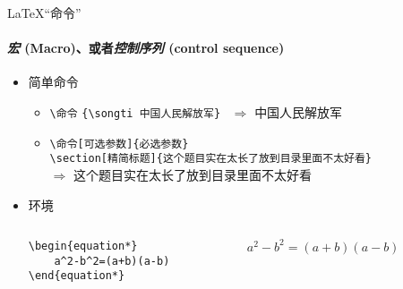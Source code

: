 \begin{frame}[fragile]{\LaTeX“命令”}
\framesubtitle{\emph{宏} (Macro)、或者\emph{控制序列} (control sequence)}
  \begin{itemize}
  \item 简单命令
    \begin{itemize}
        \item \verb|\命令|\hspace{2em}
            \verb|{\songti 中国人民解放军}| ~$\Rightarrow$ {\songti 中国人民解放军}
        \item \verb|\命令[可选参数]{必选参数}|\\
            \verb|\section[精简标题]{这个题目实在太长了放到目录里面不太好看}|\\
            $\Rightarrow$ { \hspace{1em} \songti 这个题目实在太长了放到目录里面不太好看}
    \end{itemize}
  \item 环境
    \begin{columns}[c]
        \begin{column}{0.45\textwidth}
            \begin{lstlisting}[basicstyle=\ttfamily]
\begin{equation*}
    a^2-b^2=(a+b)(a-b)
\end{equation*}
            \end{lstlisting}
        \end{column}\hspace{1em}
        \begin{column}{0.45\textwidth}
            $ a^2-b^2=(a+b)(a-b)$
        \end{column}
    \end{columns}
  \end{itemize}
\end{frame}
  
